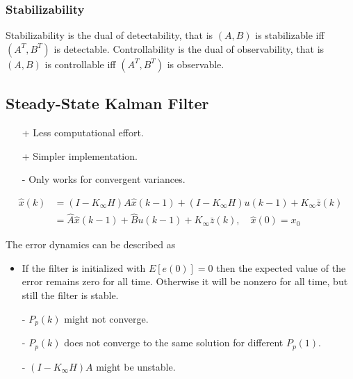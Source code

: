\documentclass[10pt,a4paper]{scrartcl}
\begin{document}
\begin{multicols*}{2}
\begin{multicols*}{3}
\subsubsection{Stabilizability}

Stabilizability is the dual of detectability, that is $(A,B)$ is stabilizable iff $(A^T, B^T)$ is detectable. Controllability is the dual of observability, that is $(A,B)$ is controllable iff $(A^T,B^T)$ is observable.

\subsection{Steady-State Kalman Filter}

\begin{itemize}
\item[+] Less computational effort.
\item[+] Simpler implementation.
\item[-] Only works for convergent variances.
\end{itemize}



\begin{align*}
\hat{x}(k)&=(I-K_\infty H)A\hat{x}(k-1)+(I-K_\infty H)u(k-1)+K_\infty \bar{z}(k)\\
&=\hat{A}\hat{x}(k-1)+\hat{B}u(k-1)+K_\infty\bar{z}(k),\quad \hat{x}(0)=x_0
\end{align*}

The error dynamics can be described as



\begin{itemize}
\item If the filter is initialized with $E[e(0)]=0$ then the expected value of the error remains zero for all time. Otherwise it will be nonzero for all time, but still the filter is stable.
\item[-] $P_p(k)$ might not converge.
\item[-] $P_p(k)$ does not converge to the same solution for different $P_p(1)$.
\item[-] $(I-K_\infty H)A$ might be unstable.
\end{itemize}


\end{multicols*}
\end{multicols*}
\end{document}
